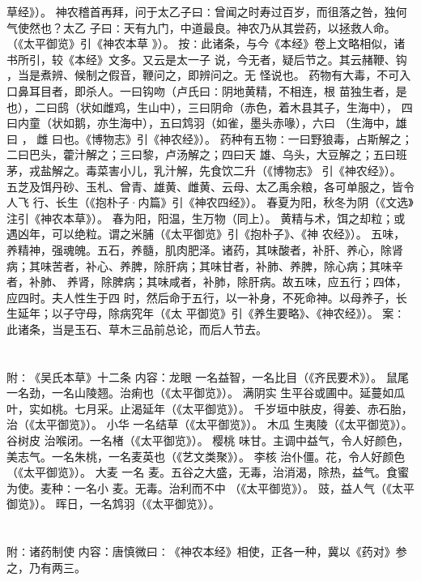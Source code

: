 \documentclass[12pt,UTF8]{ctexbook}
\begin{document}
草经》）。 
神农稽首再拜，问于太乙子曰∶曾闻之时寿过百岁，而徂落之咎，独何气使然也？太乙 
子曰∶天有九门，中道最良。神农乃从其尝药，以拯救人命。（《太平御览》引《神农本草 
》）。 
按∶此诸条，与今《本经》卷上文略相似，诸书所引，较《本经》文多。又云是太一子 
说，今无者，疑后节之。其云赭鞭、钩 ，当是煮辨、候制之假音，鞭问之，即辨问之。无 
怪说也。 
药物有大毒，不可入口鼻耳目者，即杀人。一曰钩吻（卢氏曰∶阴地黄精，不相连，根 
苗独生者，是也），二曰鸱（状如雌鸡，生山中），三曰阴命（赤色，着木县其子，生海中）， 
四曰内童（状如鹅，亦生海中），五曰鸩羽（如雀，墨头赤喙），六曰 （生海中，雄曰 ， 
雌 
曰也。《博物志》引《神农经》）。 
药种有五物∶一曰野狼毒，占斯解之；二曰巴头，藿汁解之；三曰黎，卢汤解之；四曰天 
雄、乌头，大豆解之；五曰班茅，戎盐解之。毒菜害小儿，乳汁解，先食饮二升（《博物志》 
引《神农经》）。 
五芝及饵丹砂、玉札、曾青、雄黄、雌黄、云母、太乙禹余粮，各可单服之，皆令人飞 
行、长生（《抱朴子·内篇》引《神农四经》）。 
春夏为阳，秋冬为阴（《文选》注引《神农本草》）。 
春为阳，阳温，生万物（同上）。 
黄精与术，饵之却粒；或遇凶年，可以绝粒。谓之米脯（《太平御览》引《抱朴子》、《神 
农经》）。 
五味，养精神，强魂魄。五石，养髓，肌肉肥泽。诸药，其味酸者，补肝、养心，除肾 
病；其味苦者，补心、养脾，除肝病；其味甘者，补肺、养脾，除心病；其味辛者，补肺、 
养肾，除脾病；其味咸者，补肺，除肝病。故五味，应五行；四体，应四时。夫人性生于四 
时，然后命于五行，以一补身，不死命神。以母养子，长生延年；以子守母，除病究年（《太 
平御览》引《养生要略》、《神农经》）。 
案∶此诸条，当是玉石、草木三品前总论，而后人节去。 


\chapter{}附∶《吴氏本草》十二条
内容：龙眼 一名益智，一名比目（《齐民要术》）。 
鼠尾 一名劲，一名山陵翘。治痢也（《太平御览》）。 
满阴实 生平谷或圃中。延蔓如瓜叶，实如桃。七月采。止渴延年（《太平御览》）。 
千岁垣中肤皮，得姜、赤石胎，治（《太平御览》）。 
小华 一名结草（《太平御览》）。 
木瓜 生夷陵（《太平御览》）。 
谷树皮 治喉闭。一名楮（《太平御览》）。 
樱桃 味甘。主调中益气，令人好颜色，美志气。一名朱桃，一名麦英也（《艺文类聚》）。 
李核 治仆僵。花，令人好颜色（《太平御览》）。 
大麦 一名 麦。五谷之大盛，无毒，治消渴，除热，益气。食蜜为使。麦种∶一名小 
麦。无毒。治利而不中 （《太平御览》）。 
豉，益人气（《太平御览》）。 
晖日，一名鸩羽（《太平御览》）。 


\chapter{}附∶诸药制使
内容：唐慎微曰∶《神农本经》相使，正各一种，冀以《药对》参之，乃有两三。 
\end{document}
